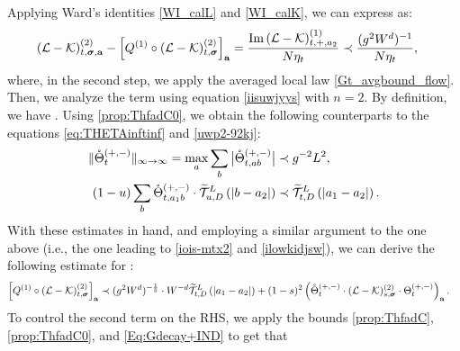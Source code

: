 Applying Ward's identities \eqref{WI_calL} and \eqref{WI_calK}, we can express  as: 
\begin{align}\label{zYU1}
    (\mathcal{L} - \mathcal{K})^{(2)}_{t, {\boldsymbol{\sigma}}, {{\mathbf{a}}}} - \left[Q^{(1)}\circ(\mathcal{L} - \mathcal{K})^{(2)}_{t, {\boldsymbol{\sigma}}}\right]_{{{\mathbf{a}}}}&=
\frac{\operatorname{{\mathrm{Im}}} {({\mathcal L-\mathcal K})^{(1)} _{t,+, a_2}}}{N\eta_t}  \prec {\frac{(g^{2}W^{d})^{-1}}{N\eta_t}},
\end{align}
where, in the second step, we apply the averaged local law \eqref{Gt_avgbound_flow}. 
Then, we analyze the term  using equation \eqref{iisuwjyys} with $n=2$. By definition, we have  . Using \eqref{prop:ThfadC0}, we obtain the following counterparts to the equations \eqref{eq:THETAinftinf} and \eqref{uwp2-92kj}: 
\begin{align}\label{ThetaBcirc_infint} 
\|\mathring \Theta_t^{(+,-)}\|_{\infty\to \infty} = \max_a \sum_{b}\big|\mathring \Theta^{(+,-)}_{t,ab}\big| & \prec g^{-2}L^2, \\ \label{uwp2-92kj00}
 (1-u) \sum_b \mathring \Theta_{t,a_1b}^{(+,-)} \cdot \widetilde{  \mathcal T}^{L}_{u,D}\left({|b-a_2|}\right) &\prec \widetilde{  \mathcal T}^{L}_{t,D}\left({|a_1-a_2|}\right).
\end{align}
With these estimates in hand, and employing a similar argument to the one above (i.e., the one leading to \eqref{iois-mtx2} and \eqref{ilowkidjsw}), we can derive the following estimate for  : 
\begin{align}\label{zYU2}
\left[Q^{(1)}\circ(\mathcal{L} - \mathcal{K})^{(2)}_{t, {\boldsymbol{\sigma}}}\right]_{{{\mathbf{a}}}}
& \prec (g^{2}W^d)^{-\frac15}\cdot W^{-d}\widetilde{  \mathcal T}^{L }_{t,D}\left({|a_1-a_2|}\right)+ (1-s)^2 \left(\mathring \Theta_t^{(+,-)} \cdot(\mathcal{L}-\mathcal{K})^{(2)}_{s,  {\boldsymbol{\sigma}}} \cdot \Theta_t^{(+,-)}\right)_{{\mathbf{a}}} .
\end{align}
To control the second term on the RHS, we apply the bounds \eqref{prop:ThfadC}, \eqref{prop:ThfadC0}, and \eqref{Eq:Gdecay+IND} to get that 
